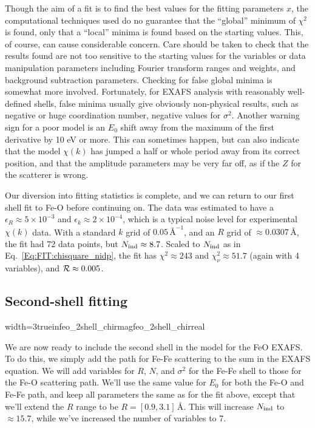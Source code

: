 Though the aim of a fit is to find the best values for the fitting
parameters $x$, the computational techniques used do no guarantee that the
``global'' minimum of $\chi^2$ is found, only that a ``local'' minima is
found based on the starting values.  This, of course, can cause
considerable concern.  Care should be taken to check that the results found
are not too sensitive to the starting values for the variables or data
manipulation parameters including Fourier transform ranges and weights, and
background subtraction parameters.  Checking for false global minima is
somewhat more involved.  Fortunately, for EXAFS analysis with reasonably
well-defined shells, false minima usually give obviously non-physical
results, such as negative or huge coordination number, negative values for
$\sigma^2$.  Another warning sign for a poor model is an $E_0$ shift away
from the maximum of the first derivative by 10 eV or more.  This can
sometimes happen, but can also indicate that the model $\chi(k)$ has jumped
a half or whole period away from its correct position, and that the
amplitude parameters may be very far off, as if the $Z$ for the scatterer
is wrong.

Our diversion into fitting statistics is complete, and we can return to our
first shell fit to Fe-O before continuing on.  The data was estimated to
have a $\epsilon_R \approx 5\times10^{-3}$ and $\epsilon_k \approx
2\times10^{-4}$, which is a typical noise level for experimental $\chi(k)$ data.
With a standard $k$ grid of $0.05\,\text{\AA}^{-1}$, and an $R$ grid of
$\approx 0.0307\, \text{\AA}$, the fit had 72 data points, but $N_{\rm ind}
\approx 8.7$.  Scaled to $N_{\rm ind}$ as in
Eq.~\ref{Eq:FIT:chisquare_nidp}, the fit has $\chi^2 \approx 243$ and
$\chi^2_{\nu} \approx 51.7$ (again with 4 variables), and ${\cal{R}}
\approx 0.005$.


\subsection{Second-shell fitting}

\begin{Sfig}{width=3truein}{feo_2shell_chirmag}{feo_2shell_chirreal}
\caption{EXAFS $|\chi(R)|$ (left) and ${\rm Re}[\chi(R)]$ (right)
  for FeO (blue) and best-fit model (red) for the
  first two shells around Fe, including Fe-O and Fe-Feo scattering paths.}
  \label{Fig:FIT:feo2a}
\end{Sfig}

We are now ready to include the second shell in the model for the FeO
EXAFS.  To do this, we simply add the path for Fe-Fe scattering to the sum
in the EXAFS equation.  We will add variables for $R$, $N$, and $\sigma^2$
for the Fe-Fe shell to those for the Fe-O scattering path.  We'll use the
same value for $E_0$ for both the Fe-O and Fe-Fe path, and keep all
parameters  the same as for the fit above, except that we'll extend the $R$
range to be $R=[0.9, 3.1]\,\text{\AA}$.   This will increase  $N_{\rm ind}$ to
$\approx 15.7$, while we've increased the number of variables to 7.



